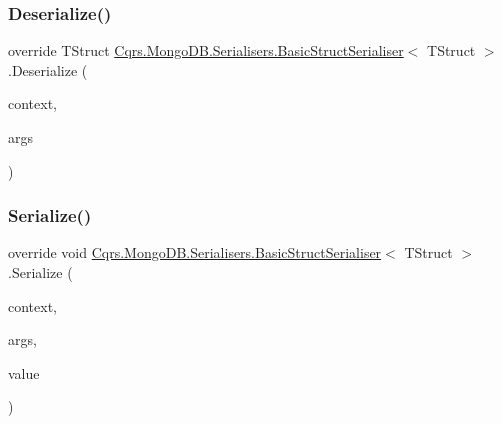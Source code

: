 \subsubsection{\texorpdfstring{Deserialize()}{Deserialize()}}
{\footnotesize\ttfamily override T\+Struct \hyperlink{classCqrs_1_1MongoDB_1_1Serialisers_1_1BasicStructSerialiser}{Cqrs.\+Mongo\+D\+B.\+Serialisers.\+Basic\+Struct\+Serialiser}$<$ T\+Struct $>$.Deserialize (\begin{DoxyParamCaption}\item[{Bson\+Deserialization\+Context}]{context,  }\item[{Bson\+Deserialization\+Args}]{args }\end{DoxyParamCaption})}

\mbox{\label{classCqrs_1_1MongoDB_1_1Serialisers_1_1BasicStructSerialiser_afeddf8cf8fa5a761f01504795adafa9b_afeddf8cf8fa5a761f01504795adafa9b}} 
\subsubsection{\texorpdfstring{Serialize()}{Serialize()}}
{\footnotesize\ttfamily override void \hyperlink{classCqrs_1_1MongoDB_1_1Serialisers_1_1BasicStructSerialiser}{Cqrs.\+Mongo\+D\+B.\+Serialisers.\+Basic\+Struct\+Serialiser}$<$ T\+Struct $>$.Serialize (\begin{DoxyParamCaption}\item[{Bson\+Serialization\+Context}]{context,  }\item[{Bson\+Serialization\+Args}]{args,  }\item[{T\+Struct}]{value }\end{DoxyParamCaption})}

